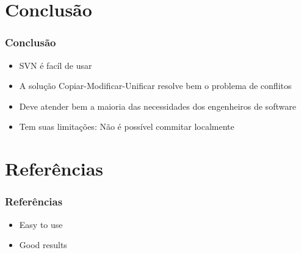 \documentclass{beamer}
\begin{document}
\section{Conclus\~ao}

\begin{frame}
    \frametitle{Conclus\~ao}

    \begin{itemize}
        \item SVN \'e fac\'il de usar
        \item A solu\c{c}\~ao Copiar-Modificar-Unificar resolve bem o problema de conflitos
        \item Deve atender bem a maioria das necessidades dos engenheiros de software
        \item Tem suas limita\c{c}\~oes: N\~ao \'e poss\'ivel commitar localmente
    \end{itemize}
\end{frame}

\section{Refer\^encias}
\begin{frame}
    \frametitle{Refer\^encias}

    \begin{itemize}
        \item Easy to use
        \item Good results
    \end{itemize}
\end{frame}
\end{document}
